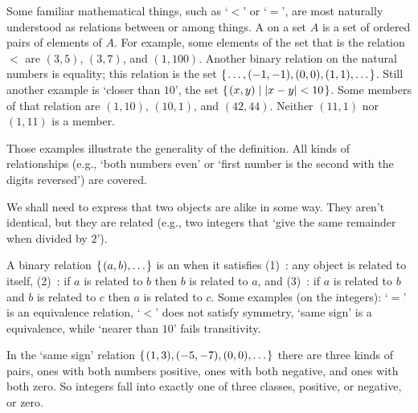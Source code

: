 Some familiar mathematical things, such as `\( < \)' or `\( = \)',
are most naturally understood as relations between or among things.
A  on a set \( A \) is
a set of ordered pairs of elements of \( A \).
For example, some elements of the set that is the
relation $<$ are
\( (3,5) \), \( (3,7) \), and \( (1,100) \).
Another binary relation on the natural numbers is equality; this relation is
the set
\( \mbox{$\{\hspace{0.1em}\ldots,(-1,-1),(0,0),(1,1),\ldots\hspace{0.1em}\}$} \).
Still another example is `closer than \( 10 \)', the set
\( \mbox{$\{\hspace{0.1em}(x,y)\mid |x-y|<10 \hspace{0.1em}\}$} \).
Some members of that relation are \( (1,10) \), \( (10,1) \),
and \( (42,44) \).
Neither \( (11,1) \) nor \( (1,11) \) is a member.

Those examples illustrate the generality of the definition.
All kinds of relationships (e.g., `both numbers
even' or `first number is the second with the digits reversed')
are covered.




We shall need to express that two objects are alike in some way.
They aren't identical, but they are related
(e.g., two integers that `give the same remainder when divided by \( 2 \)').

A binary relation \( \mbox{$\{\hspace{0.1em}(a,b),\ldots \hspace{0.1em}\}$} \)
is an 
when it satisfies
(1)~: 
     any object is related to itself,
(2)~: 
     if \( a \) is related to \( b \) then
     \( b \) is related to \( a \), and
(3)~:
     if \( a \) is related to \( b \) and \( b \) is
     related to \( c \) then \( a \) is related to \( c \).
Some examples (on the integers): `\( = \)' is an equivalence relation,
`\( < \)' does not satisfy symmetry,
`same sign' is a equivalence, while `nearer than \( 10 \)' fails transitivity.






In the `same sign' relation \( \mbox{$\{\hspace{0.1em} (1,3),(-5,-7),(0,0),\ldots\hspace{0.1em}\}$} \)
there are three kinds of pairs, ones with both numbers positive,
ones with both negative, and ones with both zero.
So integers fall into exactly one of three classes, positive, or negative,
or zero.

